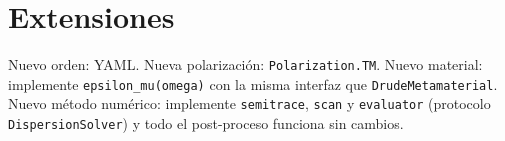 \documentclass[11pt,a4paper]{article}
\begin{document}
\section{Extensiones}

Nuevo orden: YAML. Nueva polarización: \texttt{Polarization.TM}. Nuevo material:
implemente \texttt{epsilon\_mu(omega)} con la misma interfaz que
\texttt{DrudeMetamaterial}. Nuevo método numérico: implemente
\texttt{semitrace}, \texttt{scan} y \texttt{evaluator} (protocolo
\texttt{DispersionSolver}) y todo el post-proceso funciona sin cambios.
\end{document}
